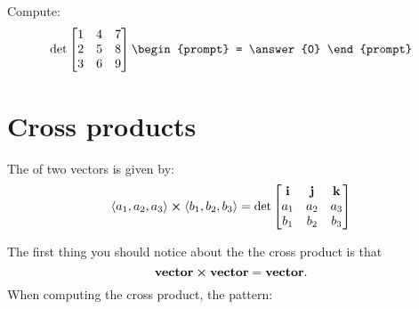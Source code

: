 \documentclass{ximera}
\begin{document}
\begin{question}
  Compute:
  \[
  \det
  \begin{bmatrix} 
    1 & 4 & 7\\
    2 & 5 & 8\\
    3 & 6 & 9\\
  \end{bmatrix}
  \begin{prompt}
    = \answer{0}
  \end{prompt}
  \]
\end{question}








\section{Cross products}

\begin{definition}
  The  of two vectors is given by: 
  \[
  \left\langle a_1,a_2,a_3\right\rangle \boldsymbol\times \left\langle b_1,b_2,b_3\right\rangle = \det
  \begin{bmatrix}
    \mathbf{i} & \mathbf{j} & \mathbf{k}\\
    a_1 & a_2 & a_3\\
    b_1 & b_2 & b_3
  \end{bmatrix}
  \]
\end{definition}
The first thing you should notice about the the cross product is that
\[
\mathbf{vector}\boldsymbol\times \mathbf{vector} = \mathbf{vector}.
\]
  When computing the cross product, the pattern:
\end{document}
